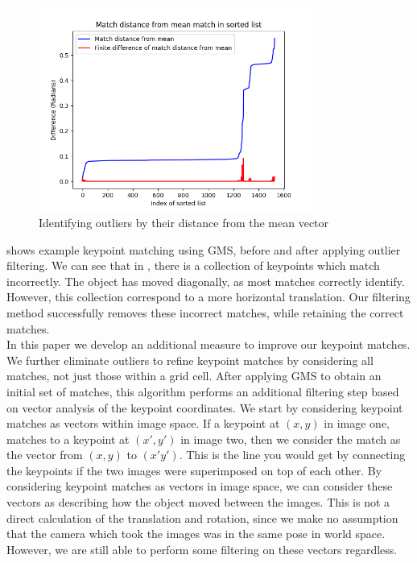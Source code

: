 \begin{figure}[h]
    \centering
    \includegraphics[width=0.8\textwidth]{figures/bad-matches.png}
    \caption{Identifying outliers by their distance from the mean vector}
    \label{fig:bad-matches}
\end{figure}

 shows example keypoint matching using GMS, before and after applying outlier filtering. We can see that in , there is a collection of keypoints which match incorrectly. The object has moved diagonally, as most matches correctly identify. However, this collection correspond to a more horizontal translation. Our filtering method successfully removes these incorrect matches, while retaining the correct matches.\\

In this paper we develop an additional measure to improve our keypoint matches. We further eliminate outliers to refine keypoint matches by considering all matches, not just those within a grid cell. After applying GMS to obtain an initial set of matches, this algorithm performs an additional filtering step based on vector analysis of the keypoint coordinates. We start by considering keypoint matches as vectors within image space. If a keypoint at $(x,y)$ in image one, matches to a keypoint at $(x',y')$ in image two, then we consider the match as the vector from $(x,y)$ to $(x'y')$. This is the line you would get by connecting the keypoints if the two images were superimposed on top of each other. By considering keypoint matches as vectors in image space, we can consider these vectors as describing how the object moved between the images. This is not a direct calculation of the translation and rotation, since we make no assumption that the camera which took the images was in the same pose in world space. However, we are still able to perform some filtering on these vectors regardless.\\

